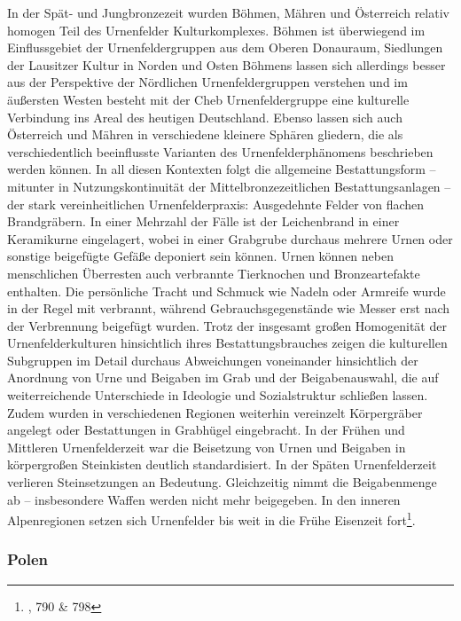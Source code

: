 \documentclass[openany,twoside,twocolumn]{book}
\let\rmarkdownfootnote\footnote%
\def\footnote{\protect\rmarkdownfootnote}
\begin{document}
In der Spät- und Jungbronzezeit wurden Böhmen, Mähren und Österreich
relativ homogen Teil des Urnenfelder Kulturkomplexes. Böhmen ist
überwiegend im Einflussgebiet der Urnenfeldergruppen aus dem Oberen
Donauraum, Siedlungen der Lausitzer Kultur in Norden und Osten Böhmens
lassen sich allerdings besser aus der Perspektive der Nördlichen
Urnenfeldergruppen verstehen und im äußersten Westen besteht mit der
Cheb Urnenfeldergruppe eine kulturelle Verbindung ins Areal des heutigen
Deutschland. Ebenso lassen sich auch Österreich und Mähren in
verschiedene kleinere Sphären gliedern, die als verschiedentlich
beeinflusste Varianten des Urnenfelderphänomens beschrieben werden
können. In all diesen Kontexten folgt die allgemeine Bestattungsform --
mitunter in Nutzungskontinuität der Mittelbronzezeitlichen
Bestattungsanlagen -- der stark vereinheitlichen Urnenfelderpraxis:
Ausgedehnte Felder von flachen Brandgräbern. In einer Mehrzahl der Fälle
ist der Leichenbrand in einer Keramikurne eingelagert, wobei in einer
Grabgrube durchaus mehrere Urnen oder sonstige beigefügte Gefäße
deponiert sein können. Urnen können neben menschlichen Überresten auch
verbrannte Tierknochen und Bronzeartefakte enthalten. Die persönliche
Tracht und Schmuck wie Nadeln oder Armreife wurde in der Regel mit
verbrannt, während Gebrauchsgegenstände wie Messer erst nach der
Verbrennung beigefügt wurden. Trotz der insgesamt großen Homogenität der
Urnenfelderkulturen hinsichtlich ihres Bestattungsbrauches zeigen die
kulturellen Subgruppen im Detail durchaus Abweichungen voneinander
hinsichtlich der Anordnung von Urne und Beigaben im Grab und der
Beigabenauswahl, die auf weiterreichende Unterschiede in Ideologie und
Sozialstruktur schließen lassen. Zudem wurden in verschiedenen Regionen
weiterhin vereinzelt Körpergräber angelegt oder Bestattungen in
Grabhügel eingebracht. In der Frühen und Mittleren Urnenfelderzeit war
die Beisetzung von Urnen und Beigaben in körpergroßen Steinkisten
deutlich standardisiert. In der Späten Urnenfelderzeit verlieren
Steinsetzungen an Bedeutung. Gleichzeitig nimmt die Beigabenmenge ab --
insbesondere Waffen werden nicht mehr beigegeben. In den inneren
Alpenregionen setzen sich Urnenfelder bis weit in die Frühe Eisenzeit
fort\footnote{\textcite{lubos_czech_2013}, 790 \& 798}.

\hypertarget{polen}{%
\subsubsection{Polen}\label{polen}}
\end{document}
